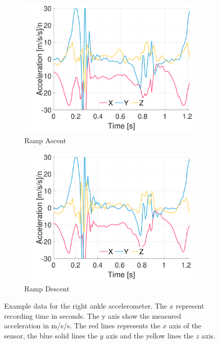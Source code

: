 \begin{figure}[p]
    \begin{subfigure}[b]{0.49\textwidth}
         \centering
         \includegraphics[width=\textwidth]{content/3-Methods/example-data/ch3_example_data_subject_01_r_ankle_accel_activity_ramp_up.pdf}
         \caption{Ramp Ascent}
    \end{subfigure}
    \begin{subfigure}[b]{0.49\textwidth}
         \centering
         \includegraphics[width=\textwidth]{content/3-Methods/example-data/ch3_example_data_subject_01_r_ankle_accel_activity_ramp_down.pdf}
         \caption{Ramp Descent}
    \end{subfigure}
    \caption[Example right ankle accelerometer data]{Example data for the right ankle accelerometer. The $x$ represent recording time in seconds. The y axis show the measured acceleration in m/s/s. The red lines represents the $x$ axis of the sensor, the blue solid lines the $y$ axis and the yellow lines the $z$ axis.}
    \label{fig:example-right-ankle-accel-sensor-data}
\end{figure}


